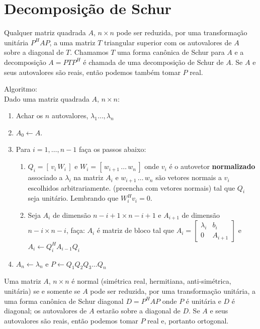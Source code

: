 \documentclass[10pt,a4paper]{article}
\begin{document}
\section{Decomposição de Schur}
\begin{theorem}
	Qualquer matriz quadrada $A$, $n \times n$ pode ser reduzida, por uma transformação unitária $P^HAP$, a uma matriz $T$ triangular superior com os autovalores de $A$ sobre a diagonal de $T$. Chamamos $T$ uma forma canônica de Schur para $A$ e a decomposição $A = PTP^H$ é chamada de uma decomposição de Schur de $A$. Se $A$ e seus autovalores são reais, então podemos também tomar $P$ real.
\end{theorem}

Algoritmo:\\
Dado uma matriz quadrada $A$, $n \times n$:
\begin{enumerate}
	\item Achar os $n$ autovalores, $\lambda_1 \dots, \lambda_n$
	\item $A_0 \leftarrow A$.
	\item Para $i = 1, \dots, n - 1$ faça os passos abaixo:
	\begin{enumerate}[label*=\arabic*.]
		\item $Q_i = [ \, v_i \, W_i \, ]$ e $W_i = [ \, w_{i+1} \, \dots \, w_{n} \, ]$ onde $v_i$ é o autovetor \textbf{normalizado} associado a $\lambda_i$ na matriz $A_i$ e $w_{i+1} \, \dots \, w_{n}$ são vetores normais a $v_i$ escolhidos arbitrariamente. (preencha com vetores normais) tal que $Q_i$ seja unitário. Lembrando que $W_i^Hv_i = 0$.
		\item Seja $A_i$ de dimensão $n - i + 1 \times n - i + 1$ e $A_{i+1}$ de dimensão $n - i \times n - i$, faça:
		$A_i$ é matriz de bloco tal que $A_i = \left[\begin{array}{cc}
			\lambda_i &     b_i \\
			        0 & A_{i+1}
		\end{array}\right]$ e  $A_i \leftarrow Q_i^H A_{i-1} Q_i$
	\end{enumerate}
	\item $A_n \leftarrow \lambda_n$ e $P \leftarrow Q_1 Q_2 Q_3 \dots Q_n$
\end{enumerate}

\begin{theorem}
	Uma matriz $A$, $n \times n$ é normal (simétrica real, hermitiana, anti-simétrica, unitária) se e somente se $A$ pode ser reduzida, por uma transformação unitária, a uma forma canônica de Schur diagonal $D = P^HAP$ onde $P$ é unitária e $D$ é diagonal; os autovalores de $A$ estarão sobre a diagonal de $D$. Se $A$ e seus autovalores são reais, então podemos tomar $P$ real e, portanto ortogonal.
\end{theorem}
\end{document}
